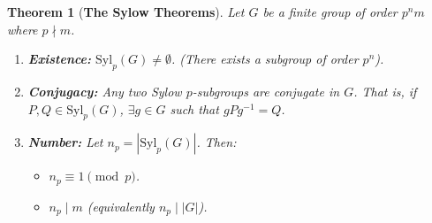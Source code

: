 \documentclass[a4paper,12pt]{article}
\newtheorem{thm}{Theorem}[section]
\begin{document}
\begin{thm}[\textbf{The Sylow Theorems}]
    Let $G$ be a finite group of order $p^n m$ where $p \nmid m$.
    \begin{enumerate}
        \item \textbf{Existence:} $\text{Syl}_p(G) \neq \emptyset$. (There exists a subgroup of order $p^n$).
        \item \textbf{Conjugacy:} Any two Sylow $p$-subgroups are conjugate in $G$. That is, if $P, Q \in \text{Syl}_p(G)$, $\exists g \in G$ such that $gPg^{-1} = Q$.
        \item \textbf{Number:} Let $n_p = |\text{Syl}_p(G)|$. Then:
            \begin{itemize}
                \item $n_p \equiv 1 \pmod{p}$.
                \item $n_p \mid m$ (equivalently $n_p \mid |G|$).
            \end{itemize}
    \end{enumerate}
\end{thm}
\end{document}
